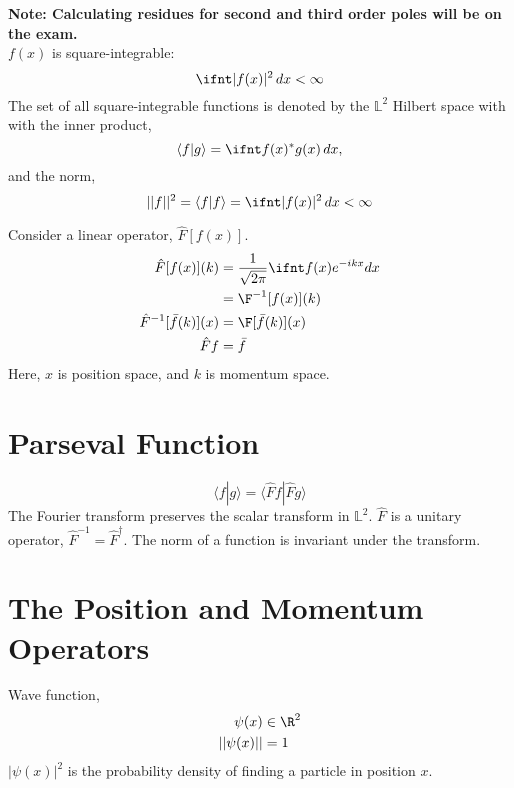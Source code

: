 \documentclass[cplx.tex]{subfiles}
\begin{document}
\textbf{Note: Calculating residues for second and third order poles will be on the exam.}\\
$f(x)$ is square-integrable:
\begin{equation}
    \ifnt |f(x)|^2\,dx < \infty 
\end{equation}
The set of all square-integrable functions is denoted by the $\mathbb{L}^2$ Hilbert space with with the inner product,
\begin{equation}
    \langle f|g\rangle = \ifnt f(x)^*g(x)\,dx, 
\end{equation}
and the norm,
\begin{equation}
    ||f||^2 = \langle f|f\rangle = \ifnt |f(x)|^2\,dx < \infty
\end{equation}

Consider a linear operator, $\hat{F}[f(x)]$.
\begin{align}
    \hat{F}[f(x)](k) &= \frac{1}{\sqrt{2\pi}} \ifnt f(x) e^{-ikx}dx \\
                     &= \F^{-1}[f(x)](k) \\
    \hat{F}^{-1}[\bar{f}(k)](x) &= \F[\bar{f}(k)](x) \\
    \hat{F}f &= \bar{f} 
\end{align}
Here, $x$ is position space, and $k$ is momentum space.

\section{Parseval Function}
\begin{equation}
    \langle f|g\rangle = \langle \hat{F}f|\hat{F}g\rangle
\end{equation}
The Fourier transform preserves the scalar transform in $\mathbb{L}^2$.
$\hat{F}$ is a unitary operator, $\hat{F}^{-1} = \hat{F}^\dagger$.
The norm of a function is invariant under the transform.

\section{The Position and Momentum Operators}
Wave function,
\begin{align}
    \psi(x) &\in \R^2 \\
    ||\psi(x)|| &= 1 
\end{align}
$|\psi(x)|^2$ is the probability density of finding a particle in position $x$.
\end{document}
